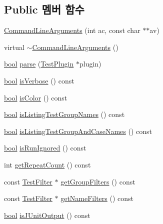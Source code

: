 \subsection*{Public 멤버 함수}
\begin{DoxyCompactItemize}
\item 
\hyperlink{class_command_line_arguments_a5f0ca7eed33a185eeba16355f6df8670}{Command\+Line\+Arguments} (int ac, const char $\ast$$\ast$av)
\item 
virtual \hyperlink{class_command_line_arguments_a145906f2c932e925628330618834b91a}{$\sim$\+Command\+Line\+Arguments} ()
\item 
\hyperlink{avb__gptp_8h_af6a258d8f3ee5206d682d799316314b1}{bool} \hyperlink{class_command_line_arguments_a22a7007b1b3c05911d5ff75e9414f3cb}{parse} (\hyperlink{class_test_plugin}{Test\+Plugin} $\ast$plugin)
\item 
\hyperlink{avb__gptp_8h_af6a258d8f3ee5206d682d799316314b1}{bool} \hyperlink{class_command_line_arguments_a72fd85d17384e6b950ab72bbd58ad7a3}{is\+Verbose} () const 
\item 
\hyperlink{avb__gptp_8h_af6a258d8f3ee5206d682d799316314b1}{bool} \hyperlink{class_command_line_arguments_a65a49d7739d9130be8be08b17fb49228}{is\+Color} () const 
\item 
\hyperlink{avb__gptp_8h_af6a258d8f3ee5206d682d799316314b1}{bool} \hyperlink{class_command_line_arguments_a58420d95dfb7d63b17f75930227c7d38}{is\+Listing\+Test\+Group\+Names} () const 
\item 
\hyperlink{avb__gptp_8h_af6a258d8f3ee5206d682d799316314b1}{bool} \hyperlink{class_command_line_arguments_a2ca7aab3e586f7db78755a7ab06e10ed}{is\+Listing\+Test\+Group\+And\+Case\+Names} () const 
\item 
\hyperlink{avb__gptp_8h_af6a258d8f3ee5206d682d799316314b1}{bool} \hyperlink{class_command_line_arguments_a9af696bb9aa71ae9b04620b5086da3eb}{is\+Run\+Ignored} () const 
\item 
int \hyperlink{class_command_line_arguments_a691b14c4fc9351f4bb71c0d16b550f37}{get\+Repeat\+Count} () const 
\item 
const \hyperlink{class_test_filter}{Test\+Filter} $\ast$ \hyperlink{class_command_line_arguments_ab3ff745da882b16758cc9c6ce7f43034}{get\+Group\+Filters} () const 
\item 
const \hyperlink{class_test_filter}{Test\+Filter} $\ast$ \hyperlink{class_command_line_arguments_a99694a1f8886d99aff3646706723c973}{get\+Name\+Filters} () const 
\item 
\hyperlink{avb__gptp_8h_af6a258d8f3ee5206d682d799316314b1}{bool} \hyperlink{class_command_line_arguments_aa01ce05097f7af18e068d629037a4fc1}{is\+J\+Unit\+Output} () const 
$$
\end{DoxyCompactItemize}
